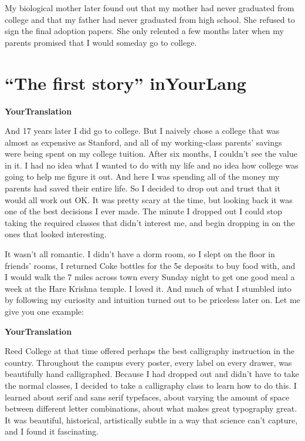 \documentclass[a4,twocolumn]{article}
\begin{document}
My biological mother later found out that my mother had never graduated from college and that my father had never graduated from high school. She refused to sign the final adoption papers. She only relented a few months later when my parents promised that I would someday go to college.

\newpage

\section*{``The first story'' inYourLang}

{\bf YourTranslation}

\newpage

And 17 years later I did go to college. But I naively chose a college that was almost as expensive as Stanford, and all of my working-class parents' savings were being spent on my college tuition. After six months, I couldn't see the value in it. I had no idea what I wanted to do with my life and no idea how college was going to help me figure it out. And here I was spending all of the money my parents had saved their entire life. So I decided to drop out and trust that it would all work out OK. It was pretty scary at the time, but looking back it was one of the best decisions I ever made. The minute I dropped out I could stop taking the required classes that didn't interest me, and begin dropping in on the ones that looked interesting.

It wasn't all romantic. I didn't have a dorm room, so I slept on the floor in friends' rooms, I returned Coke bottles for the 5¢ deposits to buy food with, and I would walk the 7 miles across town every Sunday night to get one good meal a week at the Hare Krishna temple. I loved it. And much of what I stumbled into by following my curiosity and intuition turned out to be priceless later on. Let me give you one example:

\newpage

{\bf YourTranslation}

\newpage

Reed College at that time offered perhaps the best calligraphy instruction in the country. Throughout the campus every poster, every label on every drawer, was beautifully hand calligraphed. Because I had dropped out and didn't have to take the normal classes, I decided to take a calligraphy class to learn how to do this. I learned about serif and sans serif typefaces, about varying the amount of space between different letter combinations, about what makes great typography great. It was beautiful, historical, artistically subtle in a way that science can't capture, and I found it fascinating.
\end{document}
